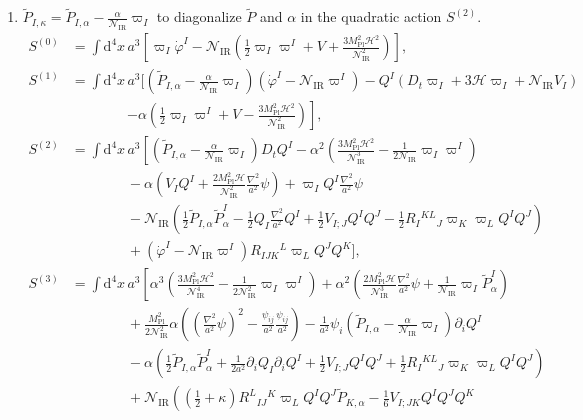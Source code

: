 \documentclass[aps, prd
, preprint
, nofootinbib 
, longbibliography
]{revtex4-1}
\newcommand{\dd}{\mathrm{d}}
\newcommand{\Mpl}{M_\mathrm{Pl}}
\newcommand{\IR}{\mathrm{IR}}
\newcommand{\calH}{\mathcal{H}}
\newcommand{\calN}{\mathcal{N}}
\newcommand{\bae}[1]{\begin{align} #1 \end{align}}
\begin{document}
\begin{enumerate}
\item $\tilde{P}_{I,\kappa}=\tilde{P}_{I,\alpha}-\frac{\alpha}{\calN_\IR}\varpi_I$ to diagonalize $\tilde{P}$ and $\alpha$ in the quadratic action $S^{(2)}$.
\bae{
    S^{(0)}&=\int\dd^4x\,a^3\left[\varpi_I\dot{\varphi}^I-\calN_\IR\left(\frac{1}{2}\varpi_I\varpi^I+V+\frac{3\Mpl^2\calH^2}{\calN_\IR^2}\right)\right], \\
    S^{(1)}&=\int\dd^4x\,a^3\biggl[\left(\tilde{P}_{I,\alpha}-\frac{\alpha}{\calN_\IR}\varpi_I\right)\left(\dot{\varphi}^I-\calN_\IR\varpi^I\right)-Q^I\left(D_t\varpi_I+3\calH\varpi_I+\calN_\IR V_I\right) \nonumber \\
    &\qquad\qquad\left.-\alpha\left(\frac{1}{2}\varpi_I\varpi^I+V-\frac{3\Mpl^2\calH^2}{\calN_\IR^2}\right)\right], \\
    S^{(2)}&=\int\dd^4x\,a^3\left[\left(\tilde{P}_{I,\alpha}-\frac{\alpha}{\calN_\IR}\varpi_I\right)D_tQ^I-\alpha^2\left(\frac{3\Mpl^2\calH^2}{\calN_\IR^3}-\frac{1}{2\calN_\IR}\varpi_I\varpi^I\right) \right. \nonumber \\
    &\qquad\qquad -\alpha\left(V_IQ^I+\frac{2\Mpl^2\calH}{\calN_\IR^2}\frac{\nabla^2}{a^2}\psi\right)+\varpi_IQ^I\frac{\nabla^2}{a^2}\psi \nonumber \\
    &\qquad\qquad -\calN_\IR\left(\frac{1}{2}\tilde{P}_{I,\alpha}\tilde{P}^I_\alpha-\frac{1}{2}Q_I\frac{\nabla^2}{a^2}Q^I+\frac{1}{2}V_{I;J}Q^IQ^J-\frac{1}{2}R_I{}^{KL}{}_J\varpi_K\varpi_LQ^IQ^J\right)\nonumber \\
    &\qquad\qquad+\left(\dot{\varphi}^I-\calN_\IR\varpi^I\right)R_{IJK}{}^L\varpi_LQ^JQ^K\biggr], \\
    S^{(3)}&=\int\dd^4x\,a^3\left[\alpha^3\left(\frac{3\Mpl^2\calH^2}{\calN_\IR^4}-\frac{1}{2\calN_\IR^2}\varpi_I\varpi^I\right)+\alpha^2\left(\frac{2\Mpl^2\calH}{\calN_\IR^3}\frac{\nabla^2}{a^2}\psi+\frac{1}{\calN_\IR}\varpi_I\tilde{P}^I_\alpha\right) \right. \nonumber \\ &\qquad\qquad+\frac{\Mpl^2}{2\calN_\IR^2}\alpha\left(\left(\frac{\nabla^2}{a^2}\psi\right)^2-\frac{\psi_{ij}}{a^2}\frac{\psi_{ij}}{a^2}\right)-\frac{1}{a^2}\psi_i\left(\tilde{P}_{I,\alpha}-\frac{\alpha}{\calN_\IR}\varpi_I\right)\partial_iQ^I  \nonumber \\
    &\qquad\qquad -\alpha\left(\frac{1}{2}\tilde{P}_{I,\alpha}\tilde{P}^I_\alpha+\frac{1}{2a^2}\partial_iQ_I\partial_iQ^I+\frac{1}{2}V_{I;J}Q^IQ^J+\frac{1}{2} R_I{}^{KL}{}_J\varpi_K\varpi_LQ^IQ^J\right) \nonumber \\
    &\qquad\qquad +\calN_\IR\left(\left(\frac{1}{2}+\kappa\right)R^L{}_{IJ}{}^K\varpi_LQ^IQ^J\tilde{P}_{K,\alpha}-\frac{1}{6}V_{I;JK}Q^IQ^JQ^K \right. \nonumber \\
}
\end{enumerate}
\end{document}
